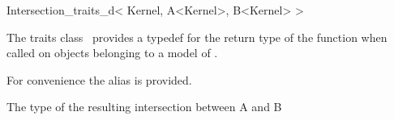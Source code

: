 \begin{ccRefClass}{Intersection_traits_d< Kernel, A<Kernel>, B<Kernel> >}


\ccDefinition

The traits class \ccClassTemplateName\ provides a typedef for the
return type of the  function when called on objects
belonging to a model of .

For convenience the alias  is provided.

\ccTypes

 The type of the resulting intersection between A and B
\end{ccRefClass}

